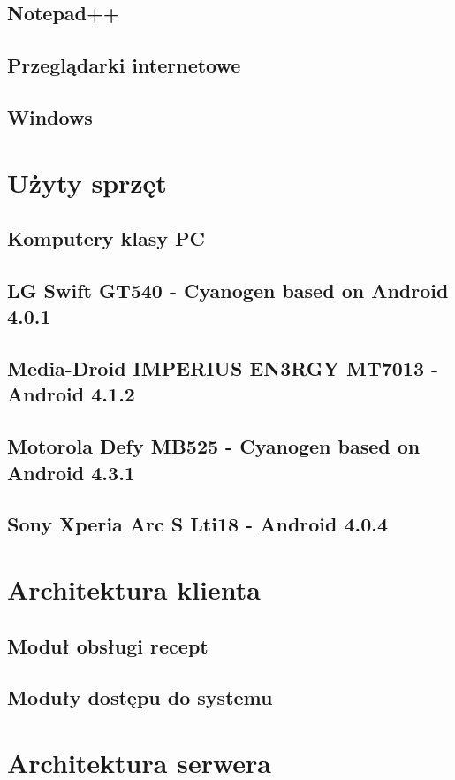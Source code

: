 \documentclass[11pt,a4paper,polish,thesis]{dcsbook}
\begin{document}
\subsection{Notepad++}
\subsection{Przeglądarki internetowe}
\subsection{Windows}
\section{Użyty sprzęt}

\subsection{Komputery klasy PC}
\subsection{LG Swift GT540 - Cyanogen based on Android 4.0.1}
\subsection{Media-Droid IMPERIUS EN3RGY MT7013 - Android 4.1.2}
\subsection{Motorola Defy MB525 - Cyanogen based on Android 4.3.1}
\subsection{Sony Xperia Arc S Lti18 - Android 4.0.4}

\section{Architektura klienta}
\subsection{Moduł obsługi recept}
\subsection{Moduły dostępu do systemu}

\section{Architektura serwera}
\end{document}
